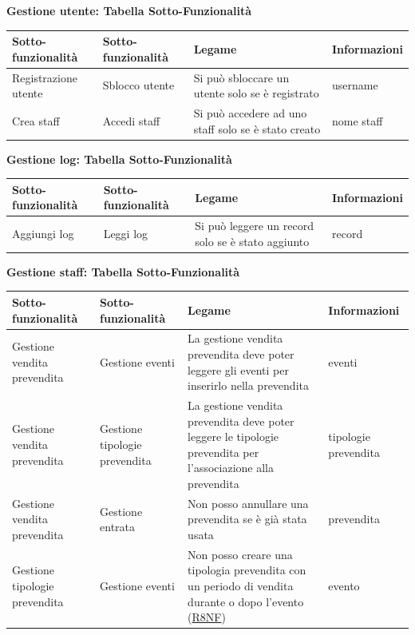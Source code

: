\documentclass[a4paper]{article}
\begin{document}
\textbf{Gestione utente: Tabella Sotto-Funzionalità}

\begin{center}
    \begin{tabularx}{1\textwidth}{|X|X|X|X|}
    \hline
    \textbf{Sotto-funzionalità} & \textbf{Sotto-funzionalità} & \textbf{Legame} & \textbf{Informazioni}\\
    \hline
    \hline
    Registrazione utente & Sblocco utente & Si può sbloccare un utente solo se è registrato & username\\
    \hline
    Crea staff & Accedi staff & Si può accedere ad uno staff solo se è stato creato & nome staff\\
    \hline
    \end{tabularx}
\end{center}

\textbf{Gestione log: Tabella Sotto-Funzionalità}

\begin{center}
    \begin{tabularx}{1\textwidth}{|X|X|X|X|}
    \hline
    \textbf{Sotto-funzionalità} & \textbf{Sotto-funzionalità} & \textbf{Legame} & \textbf{Informazioni}\\
    \hline
    \hline
    Aggiungi log & Leggi log & Si può leggere un record solo se è stato aggiunto & record\\
    \hline
    \end{tabularx}
\end{center}

\textbf{Gestione staff: Tabella Sotto-Funzionalità}

\begin{center}
    \begin{tabularx}{1\textwidth}{|X|X|X|X|}
    \hline
    \textbf{Sotto-funzionalità} & \textbf{Sotto-funzionalità} & \textbf{Legame} & \textbf{Informazioni}\\
    \hline
    \hline
    Gestione vendita prevendita & Gestione eventi & La gestione vendita prevendita deve poter leggere gli eventi per inserirlo nella prevendita & eventi\\
    \hline
    Gestione vendita prevendita & Gestione tipologie prevendita & La gestione vendita prevendita deve poter leggere le tipologie prevendita per l'associazione alla prevendita & tipologie prevendita\\
    \hline
    Gestione vendita prevendita & Gestione entrata & Non posso annullare una prevendita se è già stata usata & prevendita\\
    \hline
    Gestione tipologie prevendita & Gestione eventi & Non posso creare una tipologia prevendita con un periodo di vendita durante o dopo l'evento (\hyperlink{R8NF}{R8NF}) & evento\\
    \hline
    \end{tabularx}
\end{center}
\end{document}
